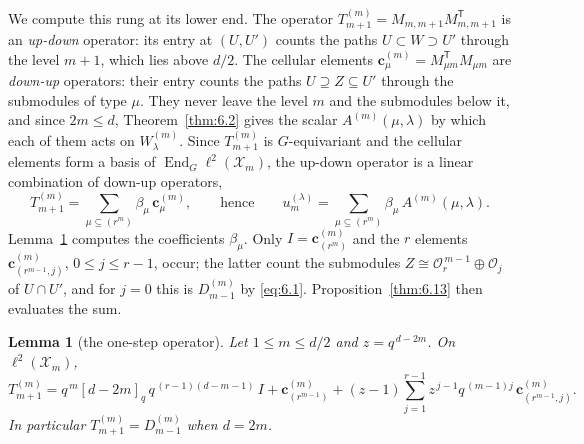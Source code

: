 \documentclass[11pt]{article}
\numberwithin{equation}{section}
\theoremstyle{plain}
\newtheorem{lemma}[theorem]{Lemma}
\theoremstyle{definition}
\begin{document}
We compute this rung at its lower end. The operator
$T^{(m)}_{m+1}=M_{m,m+1}M_{m,m+1}^{\mathsf T}$ is an \emph{up-down} operator: its entry at
$(U,U')$ counts the paths $U\subset W\supset U'$ through the level $m+1$, which lies above
$d/2$. The cellular elements $\mathbf c^{(m)}_\mu=M_{\mu m}^{\mathsf T}M_{\mu m}$ are
\emph{down-up} operators: their entry counts the paths $U\supseteq Z\subseteq U'$ through the
submodules of type $\mu$. They never leave the level $m$ and the submodules below it, and
since $2m\le d$, Theorem~\ref{thm:6.2} gives the scalar $A^{(m)}(\mu,\lambda)$ by which each
of them acts on $W^{(m)}_\lambda$. Since $T^{(m)}_{m+1}$ is $G$-equivariant and the cellular
elements form a basis of $\operatorname{End}_G\ell^2(\mathcal{X}_m)$, the up-down operator is a
linear combination of down-up operators,
\[
T^{(m)}_{m+1}=\sum_{\mu\subseteq(r^m)}\beta_\mu\,\mathbf c^{(m)}_\mu,
\qquad\text{hence}\qquad
u^{(\lambda)}_m=\sum_{\mu\subseteq(r^m)}\beta_\mu\,A^{(m)}(\mu,\lambda).
\]
Lemma~\ref{thm:6.12} computes the coefficients $\beta_\mu$. Only $I=\mathbf c^{(m)}_{(r^m)}$ and
the $r$ elements $\mathbf c^{(m)}_{(r^{m-1},j)}$, $0\le j\le r-1$, occur; the latter count the
submodules $Z\cong\mathcal{O}_r^{\,m-1}\oplus\mathcal{O}_j$ of $U\cap U'$, and for $j=0$ this
is $D^{(m)}_{m-1}$ by \eqref{eq:6.1}. Proposition~\ref{thm:6.13} then evaluates the sum.

\begin{lemma}[the one-step operator]\label{thm:6.12}
Let $1\le m\le d/2$ and $z=q^{\,d-2m}$. On $\ell^2(\mathcal{X}_m)$,
\[
T^{(m)}_{m+1}=q^{\,m}[d-2m]_q\,q^{\,(r-1)(d-m-1)}\,I+\mathbf c^{(m)}_{(r^{m-1})}
+(z-1)\sum_{j=1}^{r-1}z^{\,j-1}q^{\,(m-1)j}\,\mathbf c^{(m)}_{(r^{m-1},j)} .
\]
In particular $T^{(m)}_{m+1}=D^{(m)}_{m-1}$ when $d=2m$.
\end{lemma}
\end{document}
